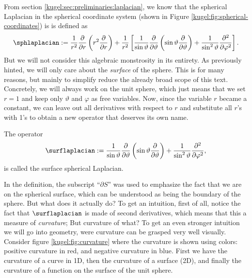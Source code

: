 From section \ref{kugel:sec:preliminaries:laplacian}, we know that the spherical
Laplacian in the spherical coordinate system (shown in Figure
\ref{kugel:fig:spherical-coordinates}) is is defined as
\begin{equation*}
    \sphlaplacian :=
      \frac{1}{r^2} \frac{\partial}{\partial r} \left(
        r^2 \frac{\partial}{\partial r}
      \right)
      + \frac{1}{r^2} \left[
          \frac{1}{\sin\vartheta} \frac{\partial}{\partial \vartheta} \left(
            \sin\vartheta \frac{\partial}{\partial\vartheta}
          \right)
        + \frac{1}{\sin^2 \vartheta} \frac{\partial^2}{\partial\varphi^2}
      \right].
\end{equation*}
But we will not consider this algebraic monstrosity in its entirety. As
previously hinted, we will only care about the \emph{surface} of the sphere.
This is for many reasons, but mainly to simplify reduce the already broad scope
of this text. Concretely, we will always work on the unit sphere, which just
means that we set $r = 1$ and keep only $\vartheta$ and $\varphi$ as free
variables.  Now, since the variable $r$ became a constant, we can leave out all
derivatives with respect to $r$ and substitute all $r$'s with 1's to obtain a
new operator that deserves its own name.

\begin{definition}
  \label{kugel:def:surface-laplacian}
  The operator
  \begin{equation*}
      \surflaplacian :=
        \frac{1}{\sin\vartheta} \frac{\partial}{\partial \vartheta} \left(
          \sin\vartheta \frac{\partial}{\partial\vartheta}
        \right)
        + \frac{1}{\sin^2 \vartheta} \frac{\partial^2}{\partial\varphi^2},
  \end{equation*}
  is called the surface spherical Laplacian.
\end{definition}

In the definition, the subscript ``$\partial S$'' was used to emphasize the fact
that we are on the spherical surface, which can be understood as being the
boundary of the sphere. But what does it actually do? To get an intuition, first
of all, notice the fact that $\surflaplacian$ is made of second derivatives,
which means that this a measure of \emph{curvature}; But curvature of what? To
get an even stronger intuition we will go into geometry, were curvature can be
grasped very well visually. Consider figure \ref{kugel:fig:curvature} where the
curvature is shown using colors: positive curvature in red, and negative
curvature in blue. First we have the curvature of a curve in 1D, then the
curvature of a surface (2D), and finally the curvature of a function on the
surface of the unit sphere.

